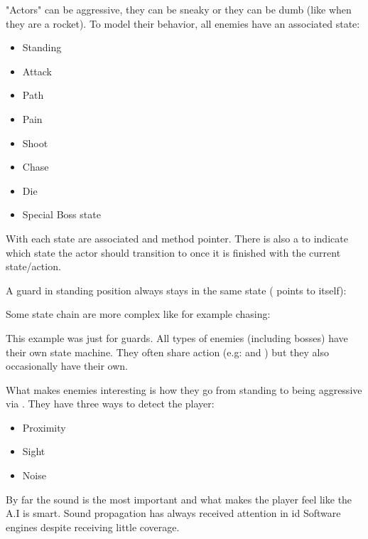 "Actors" can be aggressive, they can be sneaky or they can be dumb (like when they are a rocket). To model their behavior, all enemies have an associated state:
\begin{itemize}
\item Standing
\item Attack
\item Path
\item Pain
\item Shoot
\item Chase
\item Die
\item Special Boss state
\end{itemize}

With each state are associated  and  method pointer. There is also a  to indicate which state the actor should transition to once it is finished with the current state/action.\\
\par
\begin{minipage}{\textwidth}

\end{minipage}
\par


A guard in standing position always stays in the same state ( points to itself):\\
\par

\begin{minipage}{\textwidth}

\end{minipage}
\par
Some state chain are more complex like for example chasing:\\

\par
\begin{minipage}{\textwidth}

\end{minipage}
\par
This example was just for guards. All types of enemies (including bosses) have their own state machine. They often share action (e.g:  and ) but they also occasionally have their own.\\

\par
What makes enemies interesting is how they go from standing to being aggressive via . They have three ways to detect the player:\\
\begin{itemize}
\item Proximity
\item Sight
\item Noise
\end{itemize}
By far the sound is the most important and what makes the player feel like the A.I is smart. Sound propagation has always received attention in id Software engines despite receiving little coverage.





